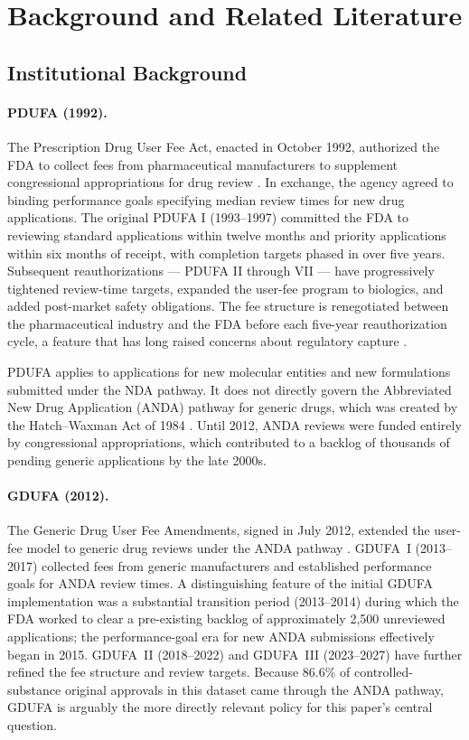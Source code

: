 \section{Background and Related Literature}
\label{sec:background}

\subsection{Institutional Background}

\paragraph{PDUFA (1992).}
The Prescription Drug User Fee Act, enacted in October 1992, authorized the FDA to collect fees from pharmaceutical manufacturers to supplement congressional appropriations for drug review \parencite{rep.dingellHR5952102ndCongress1992}. In exchange, the agency agreed to binding performance goals specifying median review times for new drug applications. The original PDUFA I (1993--1997) committed the FDA to reviewing standard applications within twelve months and priority applications within six months of receipt, with completion targets phased in over five years. Subsequent reauthorizations --- PDUFA II through VII --- have progressively tightened review-time targets, expanded the user-fee program to biologics, and added post-market safety obligations. The fee structure is renegotiated between the pharmaceutical industry and the FDA before each five-year reauthorization cycle, a feature that has long raised concerns about regulatory capture \parencite{darrowSpeedSafetyIndustry2017}.

PDUFA applies to applications for new molecular entities and new formulations submitted under the NDA pathway. It does not directly govern the Abbreviated New Drug Application (ANDA) pathway for generic drugs, which was created by the Hatch--Waxman Act of 1984 \parencite{rep.waxmanHR360598thCongress1984}. Until 2012, ANDA reviews were funded entirely by congressional appropriations, which contributed to a backlog of thousands of pending generic applications by the late 2000s.

\paragraph{GDUFA (2012).}
The Generic Drug User Fee Amendments, signed in July 2012, extended the user-fee model to generic drug reviews under the ANDA pathway \parencite{researchGDUFA2024}. GDUFA~I (2013--2017) collected fees from generic manufacturers and established performance goals for ANDA review times. A distinguishing feature of the initial GDUFA implementation was a substantial transition period (2013--2014) during which the FDA worked to clear a pre-existing backlog of approximately 2{,}500 unreviewed applications; the performance-goal era for new ANDA submissions effectively began in 2015. GDUFA~II (2018--2022) and GDUFA~III (2023--2027) have further refined the fee structure and review targets. Because 86.6\% of controlled-substance original approvals in this dataset came through the ANDA pathway, GDUFA is arguably the more directly relevant policy for this paper's central question.

